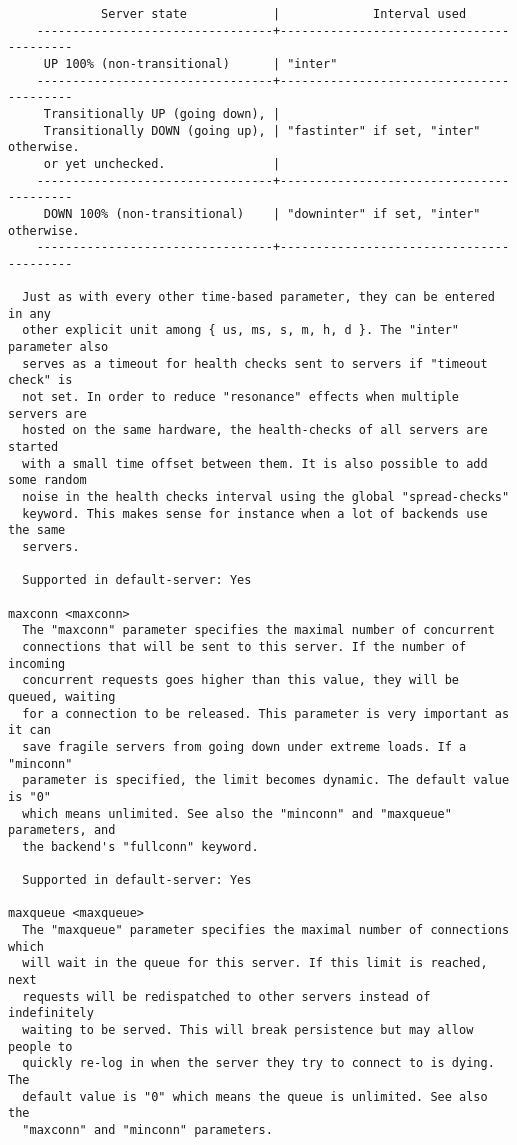 \begin{verbatim}
             Server state            |             Interval used
    ---------------------------------+-----------------------------------------
     UP 100% (non-transitional)      | "inter"
    ---------------------------------+-----------------------------------------
     Transitionally UP (going down), |
     Transitionally DOWN (going up), | "fastinter" if set, "inter" otherwise.
     or yet unchecked.               |
    ---------------------------------+-----------------------------------------
     DOWN 100% (non-transitional)    | "downinter" if set, "inter" otherwise.
    ---------------------------------+-----------------------------------------

  Just as with every other time-based parameter, they can be entered in any
  other explicit unit among { us, ms, s, m, h, d }. The "inter" parameter also
  serves as a timeout for health checks sent to servers if "timeout check" is
  not set. In order to reduce "resonance" effects when multiple servers are
  hosted on the same hardware, the health-checks of all servers are started
  with a small time offset between them. It is also possible to add some random
  noise in the health checks interval using the global "spread-checks"
  keyword. This makes sense for instance when a lot of backends use the same
  servers.

  Supported in default-server: Yes

maxconn <maxconn>
  The "maxconn" parameter specifies the maximal number of concurrent
  connections that will be sent to this server. If the number of incoming
  concurrent requests goes higher than this value, they will be queued, waiting
  for a connection to be released. This parameter is very important as it can
  save fragile servers from going down under extreme loads. If a "minconn"
  parameter is specified, the limit becomes dynamic. The default value is "0"
  which means unlimited. See also the "minconn" and "maxqueue" parameters, and
  the backend's "fullconn" keyword.

  Supported in default-server: Yes

maxqueue <maxqueue>
  The "maxqueue" parameter specifies the maximal number of connections which
  will wait in the queue for this server. If this limit is reached, next
  requests will be redispatched to other servers instead of indefinitely
  waiting to be served. This will break persistence but may allow people to
  quickly re-log in when the server they try to connect to is dying. The
  default value is "0" which means the queue is unlimited. See also the
  "maxconn" and "minconn" parameters.


\end{verbatim}
